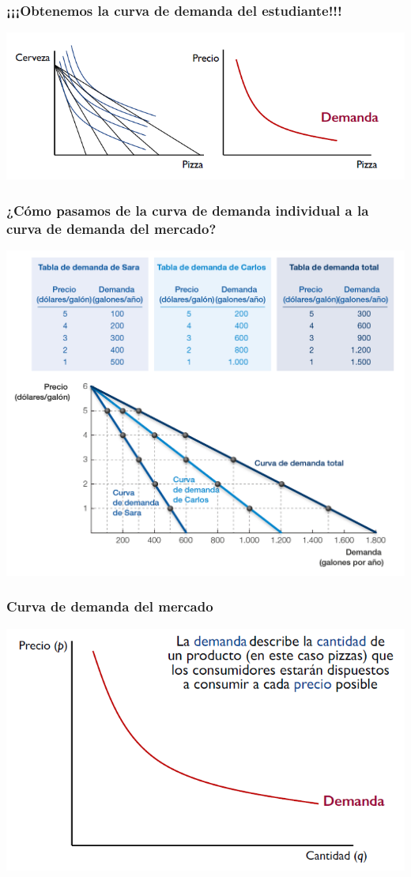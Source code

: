 \documentclass{beamer}
\begin{document}
\begin{frame}
\frametitle{¡¡¡Obtenemos la curva de demanda del estudiante!!!}
\centering
\includegraphics[scale=0.6]{Slides Principios de Economia/Figures/Tema_02.57_derivacioncurvademanda4.png}
\end{frame}

\begin{frame}
\frametitle{¿Cómo pasamos de la curva de demanda individual a la curva de demanda del mercado?}
\centering
\includegraphics[scale=0.6]{Slides Principios de Economia/Figures/Demandaagregada.png}
\end{frame}

\begin{frame}
\frametitle{Curva de demanda del mercado}
\centering
\includegraphics[scale=0.6]{Slides Principios de Economia/Figures/Tema_02.58_demanda.png}
\end{frame}
\end{document}
